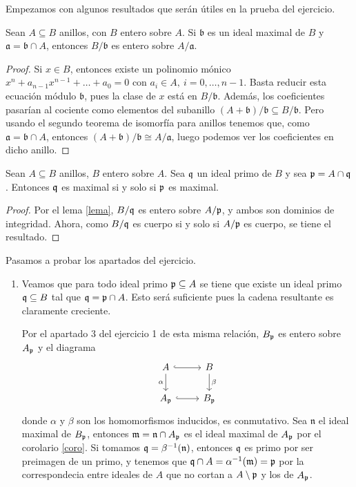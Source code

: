 \documentclass[twoside]{article}
\begin{document}
\begin{solucion}
Empezamos con algunos resultados que serán útiles en la prueba del ejercicio.
\begin{lemma}\label{lema}
Sean $A\subseteq B$ anillos, con $B$ entero sobre $A$. Si $\mathfrak{b}$ es un ideal maximal de $B$ y $\mathfrak{a}=\mathfrak{b}\cap A$, entonces $B/\mathfrak{b}$ es entero sobre $A/\mathfrak{a}$.
\end{lemma}
\begin{proof}
Si $x\in B$, entonces existe un polinomio mónico $x^n+a_{n-1}x^{n-1}+\dots+a_0=0$ con $a_i\in A,\ i=0,\dots,n-1$. Basta reducir esta ecuación módulo $\mathfrak{b}$, pues la clase de $x$ está en $B/\mathfrak{b}$. Además, los coeficientes pasarían al cociente como elementos del subanillo $(A+\mathfrak{b})/\mathfrak{b}\subseteq B/\mathfrak{b}$. Pero usando el segundo teorema de isomorfía para anillos tenemos que, como $\mathfrak{a}=\mathfrak{b}\cap A$, entonces $(A+\mathfrak{b})/\mathfrak{b}\cong A/\mathfrak{a}$, luego podemos ver los coeficientes en dicho anillo.
\end{proof}

\newpage

\begin{coro}\label{coro}
Sean $A\subseteq B$ anillos, $B$ entero sobre $A$. Sea $\mathfrak{q}$ un ideal primo de $B$ y sea $\mathfrak{p}=A\cap \mathfrak{q}$. Entonces $\mathfrak{q}$ es maximal si y solo si $\mathfrak{p}$ es maximal.
\end{coro}
\begin{proof}
Por el lema \ref{lema}, $B/\mathfrak{q}$ es entero sobre $A/\mathfrak{p}$, y ambos son dominios de integridad. Ahora, como $B/\mathfrak{q}$ es cuerpo si y solo si $A/\mathfrak{p}$ es cuerpo, se tiene el resultado.
\end{proof}

Pasamos a probar los apartados del ejercicio.

\begin{enumerate}
\item Veamos que para todo ideal primo $\mathfrak{p}\subseteq A$ se tiene que existe un ideal primo $\mathfrak{q}\subseteq B$ tal que $\mathfrak{q}=\mathfrak{p}\cap A$. Esto será suficiente pues la cadena resultante es claramente creciente. 

Por el apartado 3 del ejercicio 1 de esta misma relación, $B_{\mathfrak{p}}$ es entero sobre $A_{\mathfrak{p}}$ y el diagrama
\[
\begin{tikzcd}
A\arrow[r, hookrightarrow]\arrow[d,"\alpha"']& B\arrow[d,"\beta"]\\
A_\pp\arrow[r, hookrightarrow]& B_\pp
\end{tikzcd}
\]
donde $\alpha$ y $\beta$ son los homomorfismos inducidos, es conmutativo. Sea $\mathfrak{n}$ el ideal maximal de $B_{\mathfrak{p}}$, entonces $\mathfrak{m}=\mathfrak{n}\cap A_{\mathfrak{p}}$ es el ideal maximal de $A_{\mathfrak{p}}$ por el corolario \ref{coro}. Si tomamos $\mathfrak{q}=\beta^{-1}(\mathfrak{n})$, entonces $\mathfrak{q}$ es primo por ser preimagen de un primo, y tenemos que $\mathfrak{q}\cap A=\alpha^{-1}(\mathfrak{m})=\mathfrak{p}$ por la correspondecia entre ideales de $A$ que no cortan a $A\setminus\mathfrak{p}$ y los de $A_{\mathfrak{p}}$.


\end{enumerate}
\end{solucion}
\end{document}
